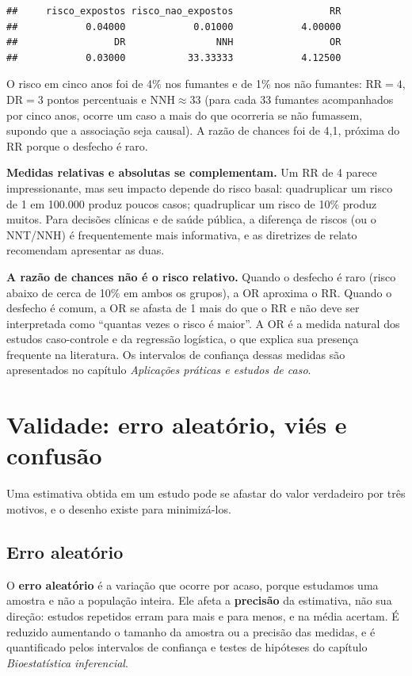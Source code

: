 \documentclass[
]{book}
\begin{document}
\begin{verbatim}
##     risco_expostos risco_nao_expostos                 RR 
##            0.04000            0.01000            4.00000 
##                 DR                NNH                 OR 
##            0.03000           33.33333            4.12500
\end{verbatim}

O risco em cinco anos foi de 4\% nos fumantes e de 1\% nos não fumantes: \(\text{RR} = 4\), \(\text{DR} = 3\) pontos percentuais e \(\text{NNH} \approx 33\) (para cada 33 fumantes acompanhados por cinco anos, ocorre um caso a mais do que ocorreria se não fumassem, supondo que a associação seja causal). A razão de chances foi de 4,1, próxima do RR porque o desfecho é raro.

\textbf{Medidas relativas e absolutas se complementam.} Um RR de 4 parece impressionante, mas seu impacto depende do risco basal: quadruplicar um risco de 1 em 100.000 produz poucos casos; quadruplicar um risco de 10\% produz muitos. Para decisões clínicas e de saúde pública, a diferença de riscos (ou o NNT/NNH) é frequentemente mais informativa, e as diretrizes de relato recomendam apresentar as duas.

\textbf{A razão de chances não é o risco relativo.} Quando o desfecho é raro (risco abaixo de cerca de 10\% em ambos os grupos), a OR aproxima o RR. Quando o desfecho é comum, a OR se afasta de 1 mais do que o RR e não deve ser interpretada como ``quantas vezes o risco é maior''. A OR é a medida natural dos estudos caso-controle e da regressão logística, o que explica sua presença frequente na literatura. Os intervalos de confiança dessas medidas são apresentados no capítulo \emph{Aplicações práticas e estudos de caso}.

\section{Validade: erro aleatório, viés e confusão}\label{validade-erro-aleatuxf3rio-viuxe9s-e-confusuxe3o}

Uma estimativa obtida em um estudo pode se afastar do valor verdadeiro por três motivos, e o desenho existe para minimizá-los.

\subsection{Erro aleatório}\label{erro-aleatuxf3rio}

O \textbf{erro aleatório} é a variação que ocorre por acaso, porque estudamos uma amostra e não a população inteira. Ele afeta a \textbf{precisão} da estimativa, não sua direção: estudos repetidos erram para mais e para menos, e na média acertam. É reduzido aumentando o tamanho da amostra ou a precisão das medidas, e é quantificado pelos intervalos de confiança e testes de hipóteses do capítulo \emph{Bioestatística inferencial}.
\end{document}

